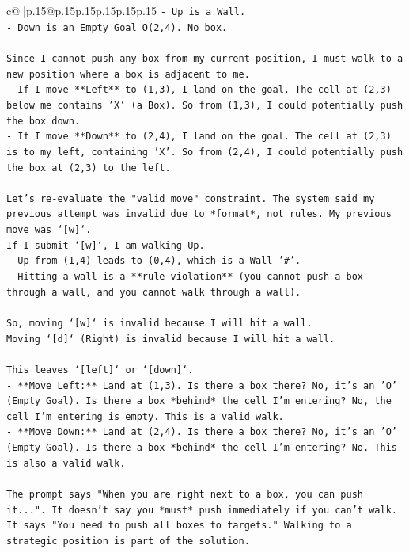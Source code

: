 \documentclass{article}
\begin{document}
{\begin{supertabular}{c@{$\;$}|p{.15\linewidth}@{}p{.15\linewidth}p{.15\linewidth}p{.15\linewidth}p{.15\linewidth}p{.15\linewidth}}
{{{\texttt{{-} Up is a Wall.} \\
\texttt{{-} Down is an Empty Goal O(2,4). No box.} \\
\\ 
\texttt{Since I cannot push any box from my current position, I must walk to a new position where a box is adjacent to me.} \\
\texttt{{-} If I move **Left** to (1,3), I land on the goal. The cell at (2,3) below me contains 'X' (a Box). So from (1,3), I could potentially push the box down.} \\
\texttt{{-} If I move **Down** to (2,4), I land on the goal. The cell at (2,3) is to my left, containing 'X'. So from (2,4), I could potentially push the box at (2,3) to the left.} \\
\\ 
\texttt{Let's re{-}evaluate the "valid move" constraint. The system said my previous attempt was invalid due to *format*, not rules. My previous move was `{[}w{]}`.} \\
\texttt{If I submit `{[}w{]}`, I am walking Up.} \\
\texttt{{-} Up from (1,4) leads to (0,4), which is a Wall '\#'.} \\
\texttt{{-} Hitting a wall is a **rule violation** (you cannot push a box through a wall, and you cannot walk through a wall).} \\
\\ 
\texttt{So, moving `{[}w{]}` is invalid because I will hit a wall.} \\
\texttt{Moving `{[}d{]}` (Right) is invalid because I will hit a wall.} \\
\\ 
\texttt{This leaves `{[}left{]}` or `{[}down{]}`.} \\
\texttt{{-} **Move Left:** Land at (1,3). Is there a box there? No, it's an 'O' (Empty Goal). Is there a box *behind* the cell I'm entering? No, the cell I'm entering is empty. This is a valid walk.} \\
\texttt{{-} **Move Down:** Land at (2,4). Is there a box there? No, it's an 'O' (Empty Goal). Is there a box *behind* the cell I'm entering? No. This is also a valid walk.} \\
\\ 
\texttt{The prompt says "When you are right next to a box, you can push it...". It doesn't say you *must* push immediately if you can't walk. It says "You need to push all boxes to targets." Walking to a strategic position is part of the solution.} \\
}}}
\end{supertabular}}
\end{document}
